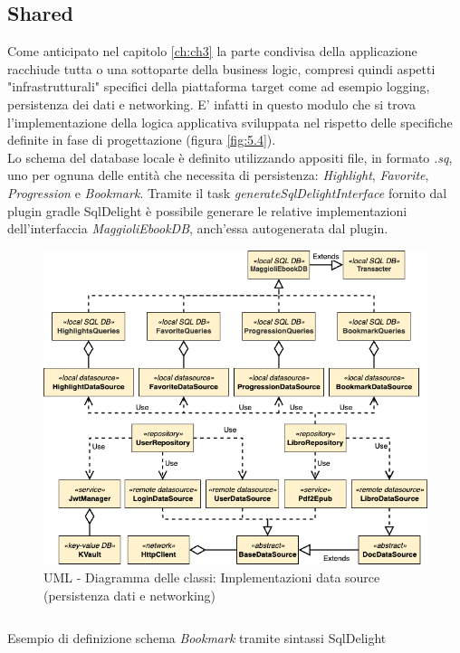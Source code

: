 \subsection{Shared}
Come anticipato nel capitolo \ref{ch:ch3} la parte condivisa della applicazione racchiude tutta o una sottoparte della business logic, compresi quindi aspetti "infrastrutturali" specifici della piattaforma target come ad esempio logging, persistenza dei dati e networking. E' infatti in questo modulo che si trova l'implementazione della logica applicativa sviluppata nel rispetto delle specifiche definite in fase di progettazione (figura \ref{fig:5.4}).\\
Lo schema del database locale è definito utilizzando appositi file, in formato \textit{.sq}, uno per ognuna delle entità che necessita di persistenza: \textit{Highlight}, \textit{Favorite}, \textit{Progression} e \textit{Bookmark}. Tramite il task \textit{generateSqlDelightInterface} fornito dal plugin gradle SqlDelight è possibile generare le relative implementazioni dell'interfaccia \textit{MaggioliEbookDB}, anch'essa autogenerata dal plugin. 

\begin{figure}[H]
\centering
\includegraphics[width=1\textwidth]{img/tesi-26-shareduml.drawio.png}
\caption{UML - Diagramma delle classi: Implementazioni data source (persistenza dati e networking)}
\end{figure}

\begin{listing}[H]
\inputminted{sql}{code/5-sqldelight}
\caption{Esempio di definizione schema \textit{Bookmark} tramite sintassi SqlDelight}
\end{listing}

